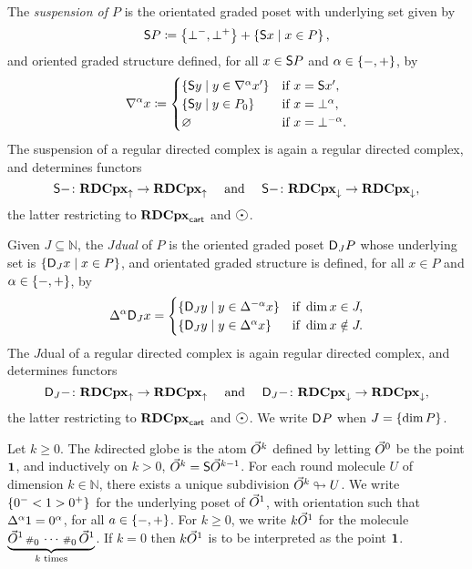 The \emph{suspension of \( P \)} is the orientated graded poset with underlying set given by
\begin{equation*}
    \sus{P} \eqdef \set{\bot^-, \bot^+} + \set{\sus{x} \mid x \in P},
\end{equation*}
and oriented graded structure defined, for all \( x \in \sus{P} \) and \( \a \in \set{-, +} \), by
\begin{equation*}
    \cofaces{}{\a} x \eqdef 
    \begin{cases}
        \set{\sus{y} \mid y \in \cofaces{}{\a} x'} & \text{if } x = \sus{x'}, \\
        \set{\sus{y} \mid y \in \gr{0}{P}} & \text{if } x = \bot^\a, \\
        \varnothing & \text{if } x = \bot^{- \a}.
    \end{cases}
\end{equation*}
The suspension of a regular directed complex is again a regular directed complex, and determines functors
\begin{equation*}
    \sus{-} \colon \rdcpxcomap \to \rdcpxcomap \quad\text{ and }\quad \sus{-} \colon \rdcpxmap \to \rdcpxmap,
\end{equation*}
the latter restricting to \( \rdcpxcart \) and \( \atom \).

Given \( J \subseteq \mathbb{N} \), the \emph{\( J \)\nbd dual} of \( P \) is the oriented graded poset \( \dual{J}{P} \) whose underlying set is \( \set{\dual{J}{x} \mid x \in P} \), and orientated graded structure is defined, for all \( x \in P \) and \( \a \in \set{-, +} \), by
\begin{equation*}
    \faces{}{\a} \dual{J}{x} = 
    \begin{cases}
        \set{\dual{J}{y} \mid y \in \faces{}{-\a} x} & \text{if } \dim x \in J,\\
        \set{\dual{J}{y} \mid y \in \faces{}{\a} x}  & \text{if } \dim x \notin J.
    \end{cases}
\end{equation*}
The \( J \)\nbd dual of a regular directed complex is again regular directed complex, and determines functors 
\begin{equation*}
    \dual{J}{-} \colon \rdcpxcomap \to \rdcpxcomap \quad\text{ and }\quad \dual{J}{-} \colon \rdcpxmap \to \rdcpxmap,
\end{equation*}
the latter restricting to \( \rdcpxcart \) and \( \atom \).
We write \( \dual{}{P} \) when \( J = \set{\dim P} \).

Let \( k \geq 0 \).
The \( k \)\nbd directed globe is the atom \( \dglobe{k} \) defined by letting \( \dglobe{0} \) be the point \( \pt \), and inductively on \( k > 0 \), \( \dglobe{k} = \sus{\dglobe{k - 1}} \).
For each round molecule \( U \) of dimension \( k \in \mathbb{N} \), there exists a unique subdivision \( \dglobe{k} \sd U \).
We write \( \set{0^- < 1 > 0^+} \) for the underlying poset of \( \dglobe{1} \), with orientation such that \( \faces{}{\a} 1 = 0^\a \), for all \( a \in \set{-, +} \).
For \( k \geq 0 \), we write \( k\arr \) for the molecule \( \underbrace{\arr \cp{0} \cdots \cp{0} \arr}_{k \text{ times}} \).
If \( k = 0 \) then \( k\arr \) is to be interpreted as the point \( \pt \).

